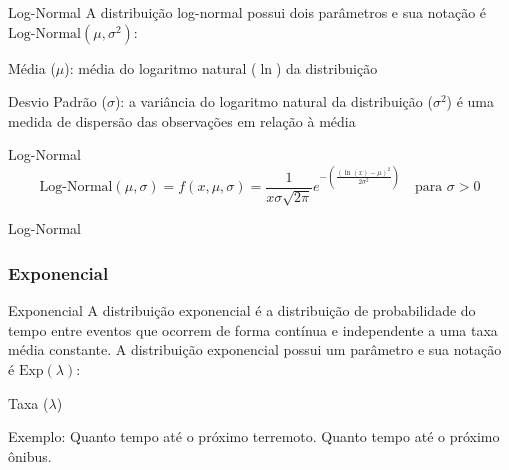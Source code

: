 \begin{frame}{Log-Normal}
    A distribuição log-normal possui dois parâmetros e sua notação é
    $\text{Log-Normal}(\mu, \sigma^2)$:
    \begin{vfilleditems}
        \item Média ($\mu$): média do logaritmo natural ($\ln$) da distribuição
        \item Desvio Padrão ($\sigma$): a variância do logaritmo natural da distribuição ($\sigma^2$) é uma medida de dispersão das observações em relação à média
    \end{vfilleditems}
\end{frame}

\begin{frame}{Log-Normal}
    $$\text{Log-Normal}(\mu,\sigma) = f(x, \mu, \sigma) = \frac{1}{x \sigma{\sqrt{2\pi}}}e^{-\left({\frac {(\ln(x)-\mu)^2}{2 \sigma^2 }}\right)} \quad \text{para $\sigma > 0$}$$
\end{frame}

\begin{frame}{Log-Normal}
    \centering
\end{frame}

\subsubsection{Exponencial}
\begin{frame}{Exponencial}
    A distribuição exponencial é a distribuição de probabilidade do tempo entre
    eventos que ocorrem de forma contínua e independente a uma taxa média constante.
    \vfill
    A distribuição exponencial possui um parâmetro e sua notação é
    $\text{Exp}(\lambda)$:
    \begin{vfilleditems}
        \item Taxa ($\lambda$)
    \end{vfilleditems}
    \vfill
    Exemplo: Quanto tempo até o próximo terremoto. Quanto tempo até o próximo ônibus.
\end{frame}

